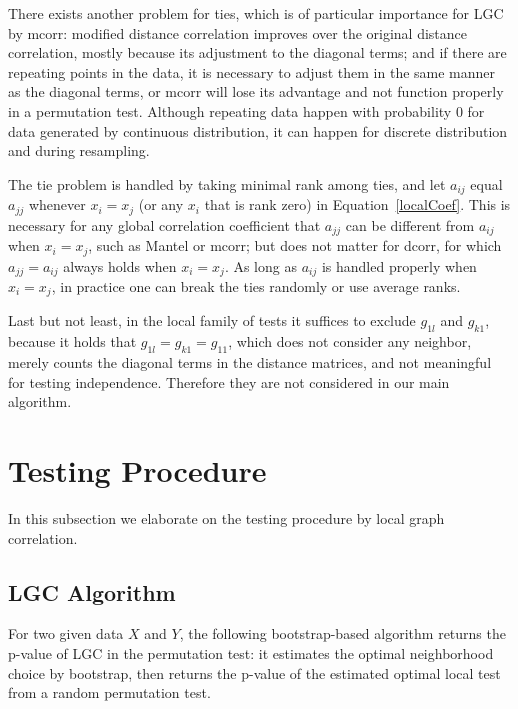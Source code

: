 \documentclass[11pt]{article}
\begin{document}
There exists another problem for ties, which is of particular importance for LGC by mcorr: modified distance correlation improves over the original distance correlation, mostly because its adjustment to the diagonal terms; and if there are repeating points in the data, it is necessary to adjust them in the same manner as the diagonal terms, or mcorr will lose its advantage and not function properly in a permutation test. Although repeating data happen with probability $0$ for data generated by continuous distribution, it can happen for discrete distribution and during resampling.

The tie problem is handled by taking minimal rank among ties, and let $a_{ij}$ equal $a_{jj}$ whenever $x_{i}=x_{j}$ (or any $x_{i}$ that is rank zero) in Equation~\ref{localCoef}. This is necessary for any global correlation coefficient that $a_{jj}$ can be different from $a_{ij}$ when $x_{i}=x_{j}$, such as Mantel or mcorr; but does not matter for dcorr, for which $a_{jj}=a_{ij}$ always holds when $x_{i}=x_{j}$. As long as $a_{ij}$ is handled properly when $x_{i}=x_{j}$, in practice one can break the ties randomly or use average ranks.

Last but not least, in the local family of tests it suffices to exclude $g_{1l}$ and $g_{k1}$, because it holds that $g_{1l}=g_{k1}=g_{11}$, which does not consider any neighbor, merely counts the diagonal terms in the distance matrices, and not meaningful for testing independence. Therefore they are not considered in our main algorithm.

\section{Testing Procedure}
\label{main3}

In this subsection we elaborate on the testing procedure by local graph correlation.

\subsection{LGC Algorithm}

For two given data $X$ and $Y$, the following bootstrap-based algorithm returns the p-value of LGC in the permutation test: it estimates the optimal neighborhood choice by bootstrap, then returns the p-value of the estimated optimal local test from a random permutation test.
\end{document}
